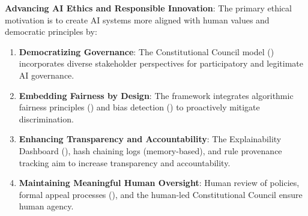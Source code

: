 \documentclass[manuscript,screen,9pt]{acmart}
\begin{document}
\textbf{Advancing AI Ethics and Responsible Innovation}:
The primary ethical motivation is to create AI systems more aligned with human values and democratic principles by:
\begin{enumerate}[leftmargin=*,itemsep=1pt,parsep=1pt]
    \item \textbf{Democratizing Governance}: The Constitutional Council model () incorporates diverse stakeholder perspectives for participatory and legitimate AI governance.
    \item \textbf{Embedding Fairness by Design}: The framework integrates algorithmic fairness principles () and bias detection () to proactively mitigate discrimination.
    \item \textbf{Enhancing Transparency and Accountability}: The Explainability Dashboard (), hash chaining logs (memory-based), and rule provenance tracking aim to increase transparency and accountability.
    \item \textbf{Maintaining Meaningful Human Oversight}: Human review of policies, formal appeal processes (), and the human-led Constitutional Council ensure human agency.
\end{enumerate}
\end{document}
